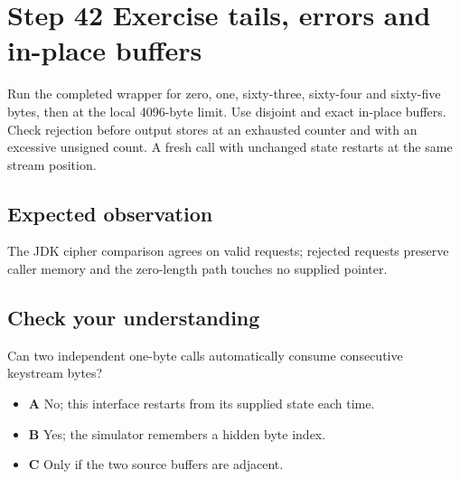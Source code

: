 \section{Step 42 Exercise tails, errors and in-place buffers}\label{chacha-s42}

Run the completed wrapper for zero, one, sixty-three, sixty-four and sixty-five bytes, then at the local 4096-byte limit. Use disjoint and exact in-place buffers. Check rejection before output stores at an exhausted counter and with an excessive unsigned count. A fresh call with unchanged state restarts at the same stream position.

\subsection{Expected observation}
The JDK cipher comparison agrees on valid requests; rejected requests preserve caller memory and the zero-length path touches no supplied pointer.

\subsection{Check your understanding}
Can two independent one-byte calls automatically consume consecutive keystream bytes?

\begin{itemize}
\item \textbf{A} No; this interface restarts from its supplied state each time.
\item \textbf{B} Yes; the simulator remembers a hidden byte index.
\item \textbf{C} Only if the two source buffers are adjacent.
\end{itemize}
